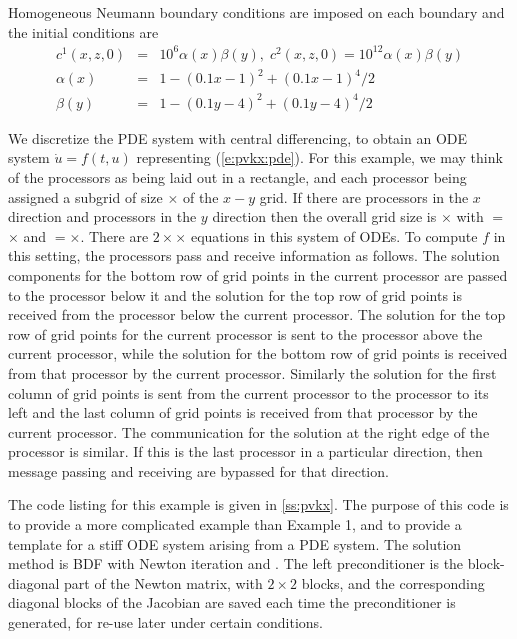Homogeneous Neumann boundary conditions are imposed on each boundary and the
initial conditions are 
\begin{eqnarray*}
c^{1}(x,z,0) &=&10^{6}\alpha (x)\beta (y),\;c^{2}(x,z,0)=10^{12}\alpha
(x)\beta (y) \\
\alpha (x) &=&1-(0.1x-1)^{2}+(0.1x-1)^{4}/2 \\
\beta (y) &=&1-(0.1y-4)^{2}+(0.1y-4)^{4}/2
\end{eqnarray*}

We discretize the PDE system with central differencing, to obtain
an ODE system $\dot{u} = f(t,u)$ representing (\ref{e:pvkx:pde}). For this
example, we may think of the processors as being laid out in a rectangle,
and each processor being assigned a subgrid of size $\times$ of
the $x-y$ grid. If there are  processors in the $x$ direction and 
processors in the $y$ direction then the overall grid size is $\times$
with $=$$\times$ and $=$$\times$.
There are $2\times$$\times$ equations in this system of ODEs. 
To compute $f$ in this setting, the processors pass and receive information as follows. 
The solution components for the bottom row of grid points in the current
processor are passed to the processor below it and the solution for the top
row of grid points is received from the processor below the current
processor. The solution for the top row of grid points for the current
processor is sent to the processor above the current processor, while the
solution for the bottom row of grid points is received from that processor
by the current processor. Similarly the solution for the first column of
grid points is sent from the current processor to the processor to its left
and the last column of grid points is received from that processor by the
current processor. The communication for the solution at the right edge of
the processor is similar. If this is the last processor in a particular
direction, then message passing and receiving are bypassed for that
direction.

The code listing for this example is given in \A\ref{ss:pvkx}. The purpose of this
code is to provide a more complicated example than Example 1, and to provide
a template for a stiff ODE system arising from a PDE system. The solution
method is BDF with Newton iteration and {\spgmr}. The left preconditioner is
the block-diagonal part of the Newton matrix, with $2 \times 2$ blocks, and
the corresponding diagonal blocks of the Jacobian are saved each time the
preconditioner is generated, for re-use later under certain conditions. 

